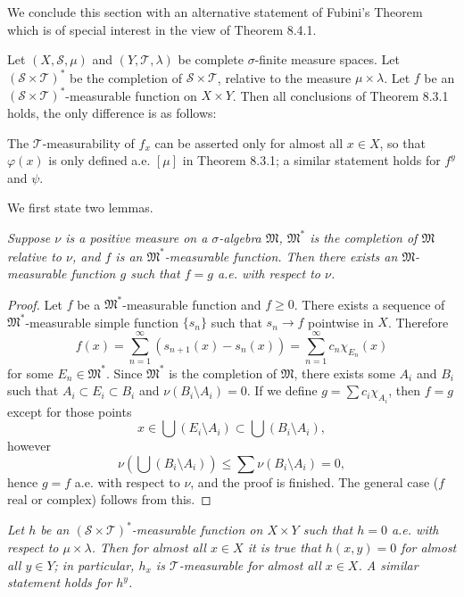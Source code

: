 We conclude this section with an alternative statement of Fubini's Theorem which is of special interest in the view of Theorem 8.4.1.
\begin{theorem}
Let $(X,\mathscr{S},\mu)$ and $(Y,\mathscr{T},\lambda)$ be complete $\sigma$-finite measure spaces. Let $(\mathscr{S}\times\mathscr{T})^*$ be the completion of $\mathscr{S}\times\mathscr{T}$, relative to the measure $\mu\times\lambda$. Let $f$ be an $(\mathscr{S}\times\mathscr{T})^*$-measurable function on $X\times Y$. Then all conclusions of Theorem 8.3.1 holds, the only difference is as follows:\par
The $\mathscr{T}$-measurability of $f_x$ can be asserted only for almost all $x\in X$, so that $\varphi(x)$ is only defined a.e. $[\mu]$ in Theorem 8.3.1; a similar statement holds for $f^y$ and $\psi$.
\end{theorem}
We first state two lemmas.
\begin{lemma}\em
Suppose $\nu$ is a positive measure on a $\sigma$-algebra $\mathfrak{M}$, $\mathfrak{M}^*$ is the completion of $\mathfrak{M}$ relative to $\nu$, and $f$ is an $\mathfrak{M}^*$-measurable function. Then there exists an $\mathfrak{M}$-measurable function $g$ such that $f=g$ a.e. with respect to $\nu$.
\end{lemma}
\begin{proof}
Let $f$ be a $\mathfrak{M}^*$-measurable function and $f\ge 0$. There exists a sequence of $\mathfrak{M}^*$-measurable simple function $\{s_n\}$ such that $s_n\to f$ pointwise in $X$. Therefore 
$$
f\left( x \right) =\sum_{n=1}^{\infty}{\left( s_{n+1}\left( x \right) -s_n\left( x \right) \right)}=\sum_{n=1}^{\infty}{c_n\chi _{E_n}\left( x \right)}
$$
for some $E_n\in\mathfrak{M}^*$. Since $\mathfrak{M}^*$ is the completion of $\mathfrak{M}$, there exists some $A_i$ and $B_i$ such that $A_i\subset E_i\subset B_i$ and $\nu(B_i\setminus A_i)=0$. If we define $g=\sum c_i\chi_{A_i}$, then $f=g$ except for those points 
$$
x\in \bigcup{\left( E_i\setminus A_i \right)}\subset \bigcup{\left( B_i\setminus A_i \right)},
$$
however 
$$
\nu \left( \bigcup{\left( B_i\setminus A_i \right)} \right) \le \sum{\nu \left( B_i\setminus A_i \right)}=0,
$$
hence $g=f$ a.e. with respect to $\nu$, and the proof is finished. The general case ($f$ real or complex) follows from this.
\end{proof}
\begin{lemma}\em
Let $h$ be an $(\mathscr{S}\times\mathscr{T})^*$-measurable function on $X\times Y$ such that $h=0$ a.e. with respect to $\mu\times\lambda$. Then for almost all $x\in X$ it is true that $h(x,y)=0$ for almost all $y\in Y$; in particular, $h_x$ is $\mathscr{T}$-measurable for almost all $x\in X$. A similar statement holds for $h^y$.
\end{lemma}
